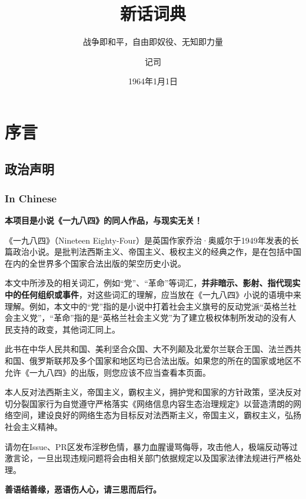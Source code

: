 \documentclass[lang=cn, color=black]{elegantbook}
\title{新话词典}
\subtitle{战争即和平，自由即奴役、无知即力量}
\date{1964年1月1日}
\author{记司}
\institute{真部}
\begin{document}
    \maketitle

    \tableofcontents

    \part*{序言}
        \chapter*{政治声明}
            \section*{In Chinese}
                \textbf{本项目是小说《一九八四》的同人作品，与现实无关！}

                《一九八四》（Nineteen Eighty-Four）是英国作家乔治·奥威尔于1949年发表的长篇政治小说。是批判法西斯主义、帝国主义、极权主义的经典之作，是在包括中国在内的全世界多个国家合法出版的架空历史小说。

                本文中所涉及的相关词汇，例如“党”、“革命”等词汇，\textbf{并非暗示、影射、指代现实中的任何组织或事件}，对这些词汇的理解，应当放在《一九八四》小说的语境中来理解。例如，本文中的“党”指的是小说中打着社会主义旗号的反动党派“英格兰社会主义党”，“革命”指的是“英格兰社会主义党”为了建立极权体制所发动的没有人民支持的政变，其他词汇同上。

                此书在中华人民共和国、美利坚合众国、大不列颠及北爱尔兰联合王国、法兰西共和国、俄罗斯联邦及多个国家和地区均已合法出版。如果您的所在的国家或地区不允许《一九八四》的出版，则您应该不应当查看本页面。

                本人反对法西斯主义，帝国主义，霸权主义，拥护党和国家的方针政策，坚决反对切分裂国家行为自觉遵守严格落实《网络信息内容生态治理规定》以营造清朗的网络空间，建设良好的网络生态为目标反对法西斯主义，帝国主义，霸权主义，弘扬社会主义精神。

                请勿在Issue、PR区发布淫秽色情，暴力血腥谩骂侮辱，攻击他人，极端反动等过激言论，一旦出现违规问题将会由相关部门依据规定以及国家法律法规进行严格处理。
                
                \begin{center}
                    \large
                    \textbf{善语结善缘，恶语伤人心，请三思而后行。}
                \end{center}
            
\end{document}
